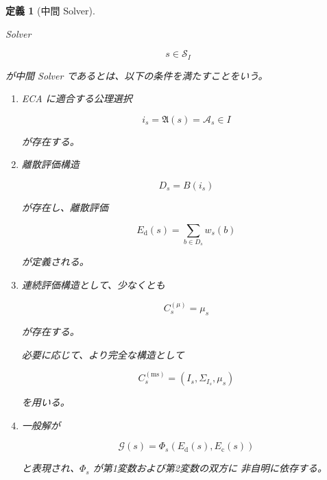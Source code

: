 \documentclass[a4paper,11pt]{article}
\newtheorem{definition}{定義}[section]
\begin{document}
\begin{definition}[中間 Solver]
\label{def:H-middle-solver}

Solver

\begin{equation}
    s\in\mathcal{S}_I
\end{equation}

が中間 Solver であるとは、以下の条件を満たすことをいう。

\begin{enumerate}[label=\textup{(\arabic*)}]

    \item
    ECA に適合する公理選択

    \begin{equation}
        i_s
        =
        \mathfrak{A}(s)
        =
        \mathcal{A}_s
        \in I
    \end{equation}

    が存在する。

    \item
    離散評価構造

    \begin{equation}
        D_s=B(i_s)
    \end{equation}

    が存在し、離散評価

    \begin{equation}
        E_{\mathrm d}(s)
        =
        \sum_{b\in D_s}w_s(b)
    \end{equation}

    が定義される。

    \item
    連続評価構造として、少なくとも

    \begin{equation}
        C_s^{(\mu)}
        =
        \mu_s
    \end{equation}

    が存在する。

    必要に応じて、より完全な構造として

    \begin{equation}
        C_s^{(\mathrm{ms})}
        =
        (I_s,\Sigma_{I_s},\mu_s)
    \end{equation}

    を用いる。

    \item
    一般解が

    \begin{equation}
        \mathcal{G}(s)
        =
        \Phi_s
        \left(
            E_{\mathrm d}(s),
            E_{\mathrm c}(s)
        \right)
    \end{equation}

    と表現され、$\Phi_s$ が第1変数および第2変数の双方に
    非自明に依存する。

\end{enumerate}
\end{definition}
\end{document}
